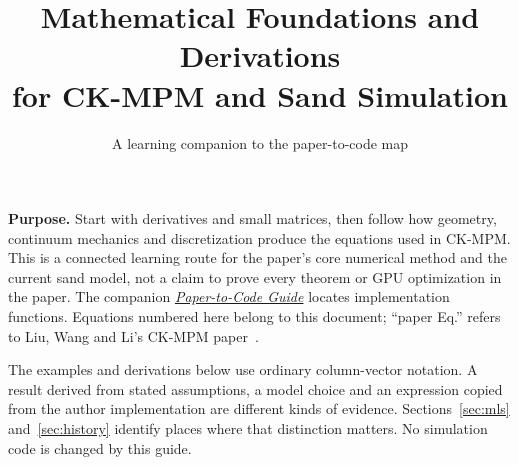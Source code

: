 \documentclass[11pt,a4paper]{article}
\title{Mathematical Foundations and Derivations\\for CK-MPM and Sand Simulation}
\author{A learning companion to the paper-to-code map}
\date{}
\numberwithin{equation}{section}
\begin{document}
\maketitle

\textbf{Purpose.} Start with derivatives and small matrices, then follow how
geometry, continuum mechanics and discretization produce the equations used
in CK-MPM. This is a connected learning route for the paper's core numerical
method and the current sand model, not a claim to prove every theorem or GPU
optimization in the paper. The companion
\href{paper_code_map.pdf}{\emph{Paper-to-Code Guide}} locates implementation
functions. Equations numbered here belong to this document; ``paper Eq.''
refers to Liu, Wang and Li's CK-MPM paper~\cite{ck}.

The examples and derivations below use ordinary column-vector notation.
A result derived from stated assumptions, a model choice and an expression
copied from the author implementation are different kinds of evidence.
Sections~\ref{sec:mls} and~\ref{sec:history} identify places where that distinction
matters. No simulation code is changed by this guide.

\tableofcontents
\newpage
\end{document}
